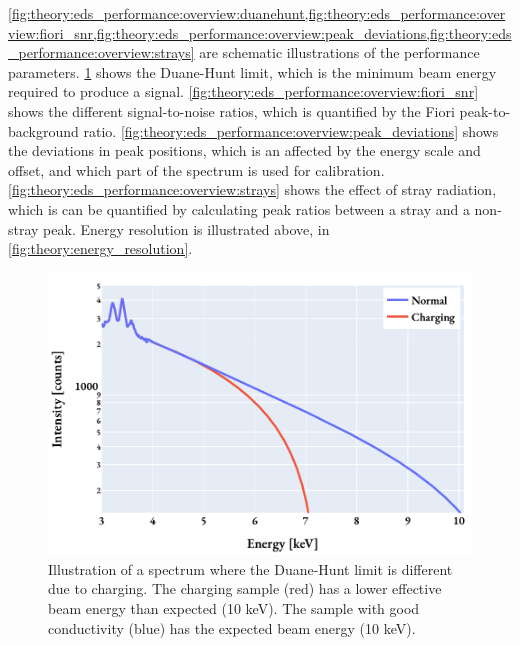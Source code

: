 \cref{fig:theory:eds_performance:overview:duanehunt,fig:theory:eds_performance:overview:fiori_snr,fig:theory:eds_performance:overview:peak_deviations,fig:theory:eds_performance:overview:strays} are schematic illustrations of the performance parameters.
\cref{fig:theory:eds_performance:overview:duanehunt} shows the Duane-Hunt limit, which is the minimum beam energy required to produce a signal.
\cref{fig:theory:eds_performance:overview:fiori_snr} shows the different signal-to-noise ratios, which is quantified by the Fiori peak-to-background ratio.
\cref{fig:theory:eds_performance:overview:peak_deviations} shows the deviations in peak positions, which is an affected by the energy scale and offset, and which part of the spectrum is used for calibration.
\cref{fig:theory:eds_performance:overview:strays} shows the effect of stray radiation, which is can be quantified by calculating peak ratios between a stray and a non-stray peak.
Energy resolution is illustrated above, in \cref{fig:theory:energy_resolution}.


\begin{figure}[htp]
    \centering
    \includegraphics[width=0.6\linewidth]{figures/pp_duane-hunt.pdf}
    \caption{
        Illustration of a spectrum where the Duane-Hunt limit is different due to charging.
        The charging sample (red) has a lower effective beam energy than expected (10 keV).
        The sample with good conductivity (blue) has the expected beam energy (10 keV).
    }
    \label{fig:theory:eds_performance:overview:duanehunt}
\end{figure}



